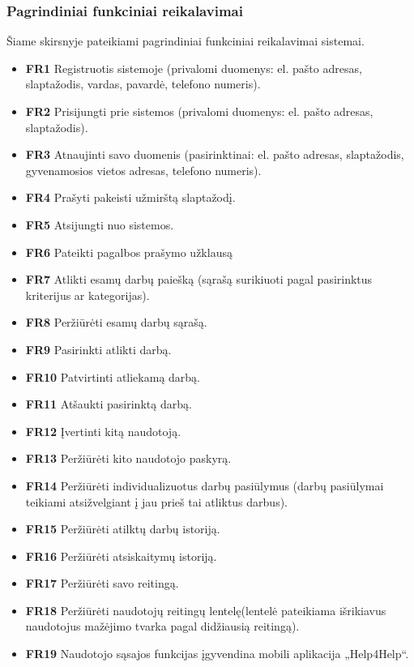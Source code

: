 \documentclass{VUMIFPSbakalaurinis}
\begin{document}
\subsubsection{Pagrindiniai funkciniai reikalavimai}
Šiame skirsnyje pateikiami pagrindiniai funkciniai reikalavimai sistemai.
\begin{itemize}
	\item \textbf{FR1} Registruotis sistemoje (privalomi duomenys: el. pašto adresas, slaptažodis, vardas, pavardė, telefono numeris).
	\item \textbf{FR2} Prisijungti prie sistemos (privalomi duomenys: el. pašto adresas, slaptažodis).
	\item \textbf{FR3} Atnaujinti savo duomenis (pasirinktinai: el. pašto adresas, slaptažodis, gyvenamosios vietos adresas, telefono numeris).
	\item \textbf{FR4} Prašyti pakeisti užmirštą slaptažodį.
	\item \textbf{FR5} Atsijungti nuo sistemos.
	\item \textbf{FR6} Pateikti pagalbos prašymo užklausą
	\item \textbf{FR7} Atlikti esamų darbų paiešką (sąrašą surikiuoti pagal pasirinktus kriterijus ar kategorijas).
	\item \textbf{FR8} Peržiūrėti esamų darbų sąrašą.
	\item \textbf{FR9} Pasirinkti atlikti darbą.
	\item \textbf{FR10} Patvirtinti atliekamą darbą.
	\item \textbf{FR11} Atšaukti pasirinktą darbą.
	\item \textbf{FR12} Įvertinti kitą naudotoją.
	\item \textbf{FR13} Peržiūrėti kito naudotojo paskyrą.
	\item \textbf{FR14} Peržiūrėti individualizuotus darbų pasiūlymus (darbų pasiūlymai teikiami atsižvelgiant į jau prieš tai atliktus darbus).
	\item \textbf{FR15} Peržiūrėti atilktų darbų istoriją.
	\item \textbf{FR16} Peržiūrėti atsiskaitymų istoriją.
	\item \textbf{FR17} Peržiūrėti savo reitingą.
	\item \textbf{FR18} Peržiūrėti naudotojų reitingų lentelę(lentelė pateikiama išrikiavus naudotojus mažėjimo tvarka pagal didžiausią reitingą).
	\item \textbf{FR19} Naudotojo sąsajos funkcijas įgyvendina mobili aplikacija „Help4Help“.
\end{itemize}
\end{document}
